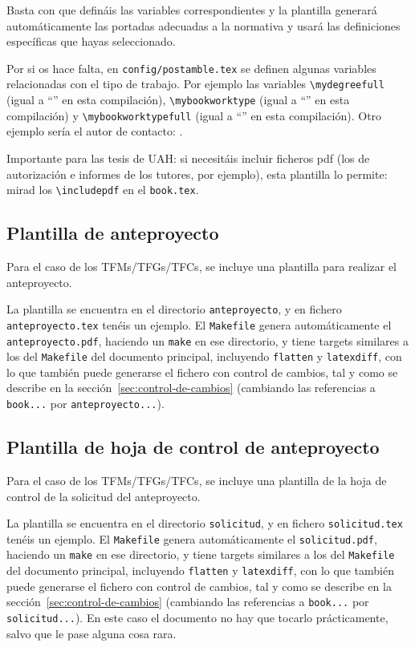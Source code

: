 Basta con que defináis las variables correspondientes y la plantilla
generará automáticamente las portadas adecuadas a la normativa y usará
las definiciones específicas que hayas seleccionado.

Por si os hace falta, en \texttt{config/postamble.tex} se definen
algunas variables relacionadas con el tipo de trabajo. Por ejemplo las
variables \texttt{\textbackslash{}mydegreefull} (igual a
``\mydegreefull'' en esta compilación),
\texttt{\textbackslash{}mybookworktype} (igual a ``\mybookworktype'' en
esta compilación) y \texttt{\textbackslash{}mybookworktypefull} (igual a
``\mybookworktypefull'' en esta compilación). Otro ejemplo sería el
autor de contacto: \contactauthor.

Importante para las tesis de UAH: si necesitáis incluir ficheros pdf
(los de autorización e informes de los tutores, por ejemplo), esta
plantilla lo permite: mirad los \texttt{\textbackslash{}includepdf} en
el \texttt{book.tex}.

\subsection{Plantilla de anteproyecto}
\label{sec:plantilla-de-anteproyecto}

Para el caso de los TFMs/TFGs/TFCs, se incluye una plantilla para
realizar el anteproyecto.

La plantilla se encuentra en el directorio \texttt{anteproyecto}, y en
fichero \texttt{anteproyecto.tex} tenéis un ejemplo. El
\texttt{Makefile} genera automáticamente el \texttt{anteproyecto.pdf},
haciendo un \texttt{make} en ese directorio, y tiene targets similares a los
del \texttt{Makefile} del documento principal, incluyendo
\texttt{flatten} y \texttt{latexdiff}, con lo que también puede
generarse el fichero con control de cambios, tal y como se describe en
la sección~\ref{sec:control-de-cambios} (cambiando las referencias a
\texttt{book...} por \texttt{anteproyecto...}).

\subsection{Plantilla de hoja de control de anteproyecto}
\label{sec:plantilla-de-hoja-control-anteproyecto}

Para el caso de los TFMs/TFGs/TFCs, se incluye una plantilla de la hoja
de control de la solicitud del anteproyecto.

La plantilla se encuentra en el directorio \texttt{solicitud}, y en
fichero \texttt{solicitud.tex} tenéis un ejemplo. El
\texttt{Makefile} genera automáticamente el \texttt{solicitud.pdf},
haciendo un \texttt{make} en ese directorio, y tiene targets similares a los
del \texttt{Makefile} del documento principal, incluyendo
\texttt{flatten} y \texttt{latexdiff}, con lo que también puede
generarse el fichero con control de cambios, tal y como se describe en
la sección~\ref{sec:control-de-cambios} (cambiando las referencias a
\texttt{book...} por \texttt{solicitud...}). En este caso el documento
no hay que tocarlo prácticamente, salvo que le pase alguna cosa rara.


